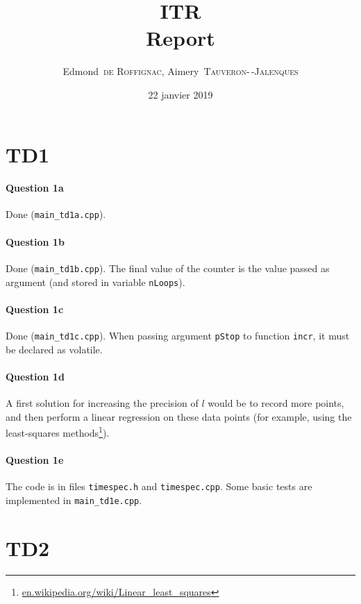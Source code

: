 \documentclass[a4paper,oneside,11pt]{article}
\title{ITR\\Report}
\author{Edmond~\textsc{de Roffignac}, Aimery~\textsc{Tauveron-\,-Jalenques}}
\date{22 janvier 2019}
\begin{document}
\maketitle


\section*{TD1}
\paragraph{Question 1a} Done (\texttt{main\_td1a.cpp}).

\paragraph{Question 1b} Done (\texttt{main\_td1b.cpp}). The final value of the counter is the value passed as argument (and stored in variable \texttt{nLoops}).

\paragraph{Question 1c} Done (\texttt{main\_td1c.cpp}). When passing argument \texttt{pStop} to function \texttt{incr}, it must be declared as volatile.

\paragraph{Question 1d} A first solution for increasing the precision of $l$ would be to record more points, and then perform a linear regression on these data points (for example, using the least-squares methods\footnote{\href{https://en.wikipedia.org/wiki/Linear_least_squares}{en.wikipedia.org/wiki/Linear\_least\_squares}}).

\paragraph{Question 1e} The code is in files \texttt{timespec.h} and \texttt{timespec.cpp}. Some basic tests are implemented in \texttt{main\_td1e.cpp}.


\section*{TD2}
\end{document}
